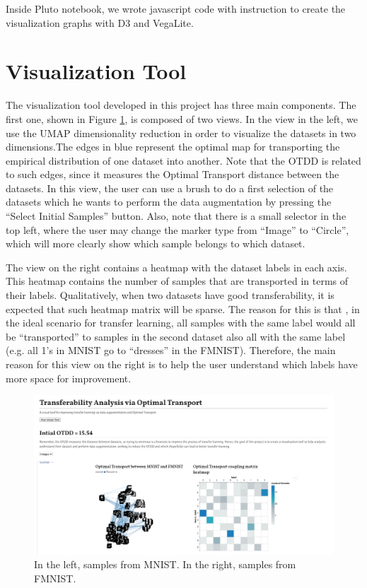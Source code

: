 \documentclass[10pt]{article}
\theoremstyle{definition}
\begin{document}
Inside Pluto notebook, we wrote javascript code with instruction to create
the visualization graphs with D3 and VegaLite.

\section{Visualization Tool}

The visualization tool developed in this project has three main components.
The first one, shown in Figure \ref{fig:mainscreen}, is composed of two views.
In the view in the left, we use the UMAP dimensionality reduction in order to visualize
the datasets in two dimensions.The edges in blue represent the optimal map
for transporting the empirical distribution of one dataset into another.
Note that the OTDD is related to such edges, since it measures the Optimal Transport
distance between the datasets. In this view, the user can use a brush to do a first
selection of the datasets which he wants to perform the data augmentation by pressing
the ``Select Initial Samples'' button.
Also, note that there is a small selector in the top left, where
the user may change the marker type from ``Image'' to ``Circle'', which
will more clearly show which sample belongs to which dataset.

The view on the right contains a heatmap with the dataset labels in each axis.
This heatmap contains the number of samples that are transported in terms
of their labels. Qualitatively, when two datasets have good transferability,
it is expected that such heatmap matrix will be sparse. The reason for this is that
, in the ideal scenario for transfer learning, all samples with the same label
would all be ``transported'' to samples in the second dataset also all with the same
label (e.g. all 1's in MNIST go to ``dresses'' in the FMNIST).
Therefore, the main reason for this view on the right is to help the user
understand which labels have more space for improvement.

\begin{figure}[H]
  \centering
  \includegraphics[width=16cm]{Figures/mainscreen.png}
  \caption{In the left, samples from MNIST. In the right, samples from FMNIST.}
  \label{fig:mainscreen}
\end{figure}
\end{document}
